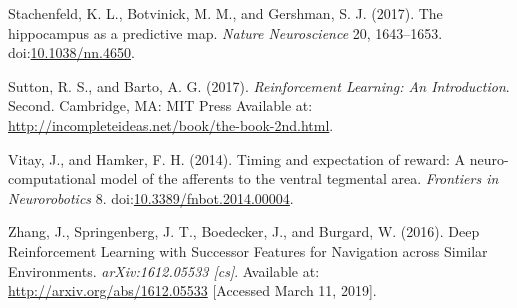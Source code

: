 \documentclass[
  11pt,
]{article}
\newlength{\cslhangindent}
\newlength{\cslentryspacingunit} %
\newenvironment{CSLReferences}[2] %
 {%
  \setlength{\parindent}{0pt}
  \ifodd #1
  \let\oldpar\par
  \def\par{\hangindent=\cslhangindent\oldpar}
  \fi
  \setlength{\parskip}{#2\cslentryspacingunit}
 }%
 {}
\begin{document}
\begin{CSLReferences}{1}{0}
\leavevmode{}%
Stachenfeld, K. L., Botvinick, M. M., and Gershman, S. J. (2017). The
hippocampus as a predictive map. \emph{Nature Neuroscience} 20,
1643--1653. doi:\href{https://doi.org/10.1038/nn.4650}{10.1038/nn.4650}.

\leavevmode{}%
Sutton, R. S., and Barto, A. G. (2017). \emph{Reinforcement {Learning}:
An {Introduction}}. Second. {Cambridge, MA}: {MIT Press} Available at:
\url{http://incompleteideas.net/book/the-book-2nd.html}.

\leavevmode{}%
Vitay, J., and Hamker, F. H. (2014). Timing and expectation of reward: A
neuro-computational model of the afferents to the ventral tegmental
area. \emph{Frontiers in Neurorobotics} 8.
doi:\href{https://doi.org/10.3389/fnbot.2014.00004}{10.3389/fnbot.2014.00004}.

\leavevmode{}%
Zhang, J., Springenberg, J. T., Boedecker, J., and Burgard, W. (2016).
Deep {Reinforcement Learning} with {Successor Features} for {Navigation}
across {Similar Environments}. \emph{arXiv:1612.05533 {[}cs{]}}.
Available at: \url{http://arxiv.org/abs/1612.05533} {[}Accessed March
11, 2019{]}.

\end{CSLReferences}
\end{document}

